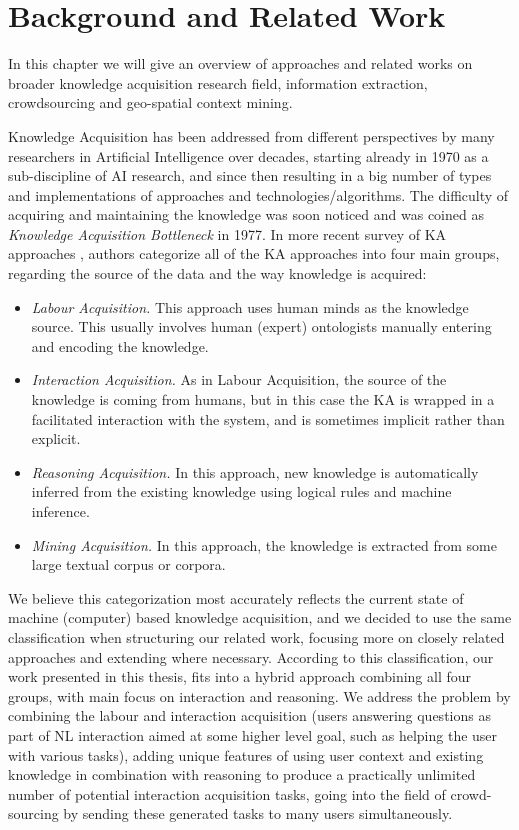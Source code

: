 \chapter{Background and Related Work}

In this chapter we will give an overview of approaches and related works on
broader knowledge acquisition research field, information extraction, 
crowdsourcing and geo-spatial context mining. 

Knowledge Acquisition has been addressed from different perspectives by many 
researchers in Artificial Intelligence over decades, starting already in 1970 
as a sub-discipline of AI research, and since then resulting in a big number of 
types and implementations of approaches and technologies/algorithms. The 
difficulty of acquiring and maintaining the knowledge was soon noticed and was 
coined as \emph{Knowledge Acquisition Bottleneck} in 
1977\parencite{Feigenbaum1977}. In more recent survey of KA approaches 
\parencite{Zang2013}, authors categorize all of the KA approaches into four main
groups, regarding the source of the data and the way knowledge is acquired:
\begin{itemize}
	\item \emph{Labour Acquisition.} This approach uses human minds as the 
    knowledge source. This usually involves human (expert) ontologists manually 
    entering and encoding the knowledge.
	\item \emph{Interaction Acquisition.} As in Labour Acquisition, the source 
    of the knowledge is coming from humans, but in this case the KA is wrapped 
    in a facilitated interaction with the system, and is sometimes implicit 
    rather than explicit.
	\item \emph{Reasoning Acquisition.} In this approach, new knowledge is 
    automatically inferred from the existing knowledge using logical rules and 
    machine inference.
	\item \emph{Mining Acquisition.} In this approach, the knowledge is 
    extracted from some large textual corpus or corpora.
\end{itemize}

We believe this categorization most accurately reflects the current state of 
machine (computer) based knowledge acquisition, and we decided to use the same 
classification when structuring our related work, focusing more on closely 
related approaches and extending where necessary. According to this 
classification, our work presented in this thesis, fits into a hybrid approach 
combining all four groups, with main focus on interaction and reasoning. We 
address the problem by combining the labour and interaction acquisition (users 
answering questions as part of NL interaction aimed at some higher level goal, 
such as helping the user with various tasks), adding unique features of using 
user context and existing knowledge in combination with reasoning to produce a 
practically unlimited number of potential interaction acquisition tasks, going 
into the field of crowd-sourcing by sending these generated tasks to many users 
simultaneously.

